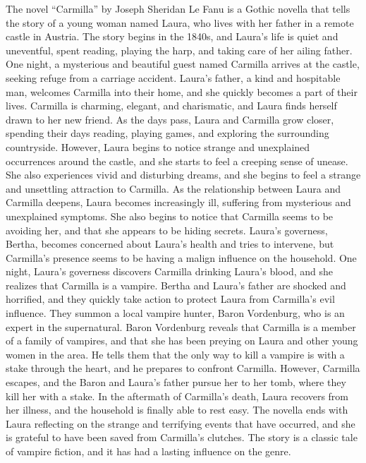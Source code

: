 \documentclass{article} %
\begin{document}
The novel ``Carmilla'' by Joseph Sheridan Le Fanu is a Gothic novella that tells the story of a young woman named Laura, who lives with her father in a remote castle in Austria. \textcolor{skipred}{The story begins in the 1840s, and Laura's life is quiet and uneventful, spent reading, playing the harp, and taking care of her ailing father.} One night, a mysterious and beautiful guest named Carmilla arrives at the castle, seeking refuge from a carriage accident. Laura's father, a kind and hospitable man, welcomes Carmilla into their home, and she quickly becomes a part of their lives. Carmilla is charming, elegant, and charismatic, and Laura finds herself drawn to her new friend. As the days pass, Laura and Carmilla grow closer, spending their days reading, playing games, and exploring the surrounding countryside. However, Laura begins to notice strange and unexplained occurrences around the castle, and she starts to feel a creeping sense of unease. She also experiences vivid and disturbing dreams, and she begins to feel a strange and unsettling attraction to Carmilla. As the relationship between Laura and Carmilla deepens, Laura becomes increasingly ill, suffering from mysterious and unexplained symptoms. She also begins to notice that Carmilla seems to be avoiding her, and that she appears to be hiding secrets. \textcolor{skipred}{Laura's governess, Bertha, becomes concerned about Laura's health and tries to intervene, but Carmilla's presence seems to be having a malign influence on the household. One night, Laura's governess discovers Carmilla drinking Laura's blood, and she realizes that Carmilla is a vampire. Bertha and Laura's father are shocked and horrified, and they quickly take action to protect Laura from Carmilla's evil influence.} They summon a local vampire hunter, Baron Vordenburg, who is an expert in the supernatural. \textcolor{skipred}{Baron Vordenburg reveals that Carmilla is a member of a family of vampires, and that she has been preying on Laura and other young women in the area.} He tells them that the only way to kill a vampire is with a stake through the heart, and he prepares to confront Carmilla. \textcolor{skipred}{However, Carmilla escapes, and the Baron and Laura's father pursue her to her tomb, where they kill her with a stake. In the aftermath of Carmilla's death, Laura recovers from her illness, and the household is finally able to rest easy. The novella ends with Laura reflecting on the strange and terrifying events that have occurred, and she is grateful to have been saved from Carmilla's clutches. The story is a classic tale of vampire fiction, and it has had a lasting influence on the genre.}
\end{document}
